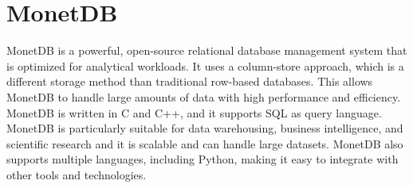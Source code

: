 \section{MonetDB}
\label{sec:monet}


MonetDB is a powerful, open-source relational database management system that is optimized for analytical workloads. It uses a column-store approach, which is a different storage method than traditional row-based databases. This allows MonetDB to handle large amounts of data with high performance and efficiency. MonetDB is written in C and C++, and it supports SQL as query language. MonetDB is particularly suitable for data warehousing, business intelligence, and scientific research and it is scalable and can handle large datasets. MonetDB also supports multiple languages, including Python, making it easy to integrate with other tools and technologies.





